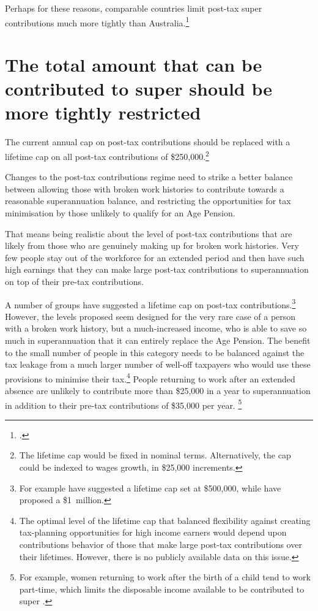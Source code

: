 \documentclass{grattanAlpha}
\begin{document}
Perhaps for these reasons, comparable countries limit post-tax super contributions much more tightly than Australia.\footcite[][8]{IndustrySuperAustralia2015-Nearly-half-Australians-not-have-comfortable-retirement}  

\section{The total amount that can be contributed to super should be more tightly restricted}\label{sec:SUPER-5-2}
The current annual cap on post-tax contributions should be replaced with a lifetime cap on all post-tax contributions of \$250,000.\footnote{The lifetime cap would be fixed in nominal terms. Alternatively, the cap could be indexed to wages growth, in \$25,000 increments.}  

Changes to the post-tax contributions regime need to strike a better balance between allowing those with broken work histories to contribute towards a reasonable superannuation balance, and restricting the opportunities for tax minimisation by those unlikely to qualify for an Age Pension.

That means being realistic about the level of post-tax contributions that are likely from those who are genuinely making up for broken work histories. Very few people stay out of the workforce for an extended period and then have such high earnings that they can make large post-tax contributions to superannuation on top of their pre-tax contributions. 

A number of groups have suggested a lifetime cap on post-tax contributions.\footnote{For example \textcite[][26]{RiceWarner2015SubmissionTaxWhitePaper} have suggested a lifetime cap set at \$500,000, while \textcite[][19]{ASFA2015TreasurySubmission} have proposed a \$1~million. }  However, the levels proposed seem designed for the very rare case of a person with a broken work history, but a much-increased income, who is able to save so much in superannuation that it can entirely replace the Age Pension. The benefit to the small number of people in this category needs to be balanced against the tax leakage from a much larger number of well-off taxpayers who would use these provisions to minimise their tax.\footnote{The optimal level of the lifetime cap that balanced flexibility against creating tax-planning opportunities for high income earners would depend upon contributions behavior of those that make large post-tax contributions over their lifetimes. However, there is no publicly available data on this issue.} 
People returning to work after an extended absence are unlikely to contribute more than \$25,000 in a year to superannuation in addition to their pre-tax contributions of \$35,000 per year.
\footnote{For example, women returning to work after the birth of a child tend to work part-time, which limits the disposable income available to be contributed to super \textcite[][222]{ProductivityCommission2009PaidParentalLeave}.}
\end{document}
